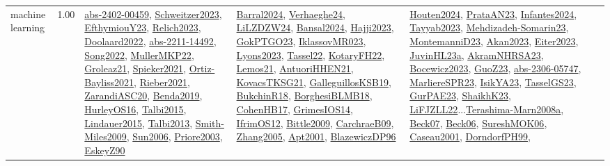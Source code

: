 {\begin{longtable}{p{3cm}r>{\raggedright\arraybackslash}p{6cm}>{\raggedright\arraybackslash}p{6cm}>{\raggedright\arraybackslash}p{8cm}}
\index{machine learning}\index{Algorithms!machine learning}machine learning &  1.00 & \hyperref[detail:abs-2402-00459]{abs-2402-00459}, \hyperref[detail:Schweitzer2023]{Schweitzer2023}, \hyperref[detail:EfthymiouY23]{EfthymiouY23}, \hyperref[detail:Relich2023]{Relich2023}, \hyperref[detail:Doolaard2022]{Doolaard2022}, \hyperref[detail:abs-2211-14492]{abs-2211-14492}, \hyperref[detail:Song2022]{Song2022}, \hyperref[detail:MullerMKP22]{MullerMKP22}, \hyperref[detail:Groleaz21]{Groleaz21}, \hyperref[detail:Spieker2021]{Spieker2021}, \hyperref[detail:Ortiz-Bayliss2021]{Ortiz-Bayliss2021}, \hyperref[detail:Rieber2021]{Rieber2021}, \hyperref[detail:ZarandiASC20]{ZarandiASC20}, \hyperref[detail:Benda2019]{Benda2019}, \hyperref[detail:HurleyOS16]{HurleyOS16}, \hyperref[detail:Talbi2015]{Talbi2015}, \hyperref[detail:Lindauer2015]{Lindauer2015}, \hyperref[detail:Talbi2013]{Talbi2013}, \hyperref[detail:Smith-Miles2009]{Smith-Miles2009}, \hyperref[detail:Sun2006]{Sun2006}, \hyperref[detail:Priore2003]{Priore2003}, \hyperref[detail:EskeyZ90]{EskeyZ90} & \hyperref[detail:Barral2024]{Barral2024}, \hyperref[detail:Verhaeghe24]{Verhaeghe24}, \hyperref[detail:LiLZDZW24]{LiLZDZW24}, \hyperref[detail:Bansal2024]{Bansal2024}, \hyperref[detail:Hajji2023]{Hajji2023}, \hyperref[detail:GokPTGO23]{GokPTGO23}, \hyperref[detail:IklassovMR023]{IklassovMR023}, \hyperref[detail:Lyons2023]{Lyons2023}, \hyperref[detail:Tassel22]{Tassel22}, \hyperref[detail:KotaryFH22]{KotaryFH22}, \hyperref[detail:Lemos21]{Lemos21}, \hyperref[detail:AntuoriHHEN21]{AntuoriHHEN21}, \hyperref[detail:KovacsTKSG21]{KovacsTKSG21}, \hyperref[detail:GalleguillosKSB19]{GalleguillosKSB19}, \hyperref[detail:BukchinR18]{BukchinR18}, \hyperref[detail:BorghesiBLMB18]{BorghesiBLMB18}, \hyperref[detail:CohenHB17]{CohenHB17}, \hyperref[detail:GrimesIOS14]{GrimesIOS14}, \hyperref[detail:IfrimOS12]{IfrimOS12}, \hyperref[detail:Bittle2009]{Bittle2009}, \hyperref[detail:CarchraeB09]{CarchraeB09}, \hyperref[detail:Zhang2005]{Zhang2005}, \hyperref[detail:Apt2001]{Apt2001}, \hyperref[detail:BlazewiczDP96]{BlazewiczDP96} & \hyperref[detail:Houten2024]{Houten2024}, \hyperref[detail:PrataAN23]{PrataAN23}, \hyperref[detail:Infantes2024]{Infantes2024}, \hyperref[detail:Tayyab2023]{Tayyab2023}, \hyperref[detail:Mehdizadeh-Somarin23]{Mehdizadeh-Somarin23}, \hyperref[detail:MontemanniD23]{MontemanniD23}, \hyperref[detail:Akan2023]{Akan2023}, \hyperref[detail:Eiter2023]{Eiter2023}, \hyperref[detail:JuvinHL23a]{JuvinHL23a}, \hyperref[detail:AkramNHRSA23]{AkramNHRSA23}, \hyperref[detail:Bocewicz2023]{Bocewicz2023}, \hyperref[detail:GuoZ23]{GuoZ23}, \hyperref[detail:abs-2306-05747]{abs-2306-05747}, \hyperref[detail:MarliereSPR23]{MarliereSPR23}, \hyperref[detail:IsikYA23]{IsikYA23}, \hyperref[detail:TasselGS23]{TasselGS23}, \hyperref[detail:GurPAE23]{GurPAE23}, \hyperref[detail:ShaikhK23]{ShaikhK23}, \hyperref[detail:LiFJZLL22]{LiFJZLL22}...\hyperref[detail:Terashima-Marn2008a]{Terashima-Marn2008a}, \hyperref[detail:Beck07]{Beck07}, \hyperref[detail:Beck06]{Beck06}, \hyperref[detail:SureshMOK06]{SureshMOK06}, \hyperref[detail:Caseau2001]{Caseau2001}, \hyperref[detail:DorndorfPH99]{DorndorfPH99}, 
\end{longtable}}
